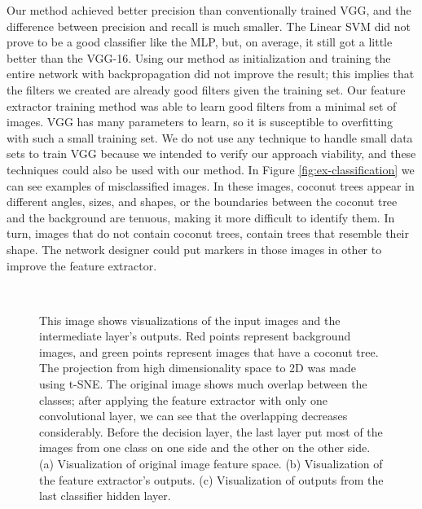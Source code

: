 \documentclass[a4paper,conference]{IEEEtran}
\begin{document}
Our method achieved better precision than conventionally trained VGG, and the difference between precision and recall is much smaller. The Linear SVM did not prove to be a good classifier like the MLP, but, on average, it still got a little better than the VGG-16. Using our method as initialization and training the entire network with backpropagation did not improve the result; this implies that the filters we created are already good filters given the training set. Our feature extractor training method was able to learn good filters from a minimal set of images. VGG has many parameters to learn, so it is susceptible to overfitting with such a small training set. We do not use any technique to handle small data sets to train VGG because we intended to verify our approach viability, and these techniques could also be used with our method. In Figure \ref{fig:ex-classification} we can see examples of misclassified images. In these images, coconut trees appear in different angles, sizes, and shapes, or the boundaries between the coconut tree and the background are tenuous, making it more difficult to identify them. In turn, images that do not contain coconut trees, contain trees that resemble their shape. The network designer could put markers in those images in other to improve the feature extractor.

\begin{figure}
  \centering
  ~
  ~
  \caption{This image shows visualizations of the input images and the intermediate layer's outputs. Red points represent background images, and green points represent images that have a coconut tree. The projection from high dimensionality space to 2D was made using t-SNE. The original image shows much overlap between the classes; after applying the feature extractor with only one convolutional layer, we can see that the overlapping decreases considerably. Before the decision layer, the last layer put most of the images from one class on one side and the other on the other side. (a) Visualization of original image feature space. (b) Visualization of the feature extractor's outputs. (c) Visualization of outputs from the last classifier hidden layer.}
\end{figure}
\end{document}

